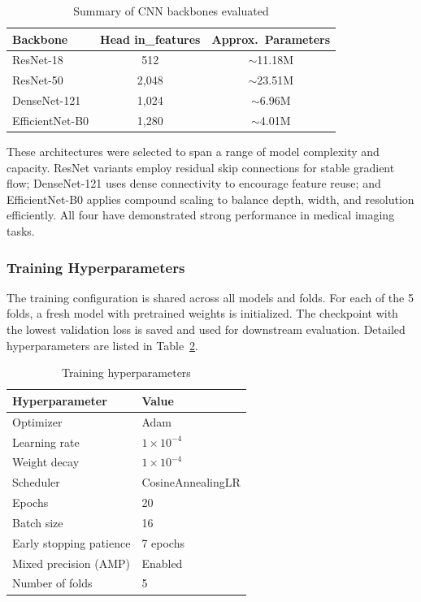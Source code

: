 \documentclass[conference]{IEEEtran}
\begin{document}
\begin{table}[t]
  \caption{Summary of CNN backbones evaluated}
  \label{tab:model_table}
  \centering
  \begin{tabular}{lcc}
    \toprule
    \textbf{Backbone} & \textbf{Head in\_features} & \textbf{Approx.\ Parameters} \\
    \midrule
    ResNet-18       & 512   & $\sim$11.18M \\
    ResNet-50       & 2,048 & $\sim$23.51M \\
    DenseNet-121    & 1,024 & $\sim$6.96M  \\
    EfficientNet-B0 & 1,280 & $\sim$4.01M  \\
    \bottomrule
  \end{tabular}
\end{table}

These architectures were selected to span a range of model complexity and capacity. ResNet
variants employ residual skip connections for stable gradient flow; DenseNet-121 uses dense
connectivity to encourage feature reuse; and EfficientNet-B0 applies compound scaling to
balance depth, width, and resolution efficiently. All four have demonstrated strong performance
in medical imaging tasks.

\subsubsection{Training Hyperparameters}

\medskip
The training configuration is shared across all models and folds. For each of the 5 folds, a
fresh model with pretrained weights is initialized. The checkpoint with the lowest validation
loss is saved and used for downstream evaluation. Detailed hyperparameters are listed in
Table~\ref{tab:train_params}.

\begin{table}[t]
  \caption{Training hyperparameters}
  \label{tab:train_params}
  \centering
  \begin{tabular}{ll}
    \toprule
    \textbf{Hyperparameter} & \textbf{Value} \\
    \midrule
    Optimizer                   & Adam \\
    Learning rate               & $1 \times 10^{-4}$ \\
    Weight decay                & $1 \times 10^{-4}$ \\
    Scheduler                   & CosineAnnealingLR \\
    Epochs                      & 20 \\
    Batch size                  & 16 \\
    Early stopping patience     & 7 epochs \\
    Mixed precision (AMP)       & Enabled \\
    Number of folds             & 5 \\
    \bottomrule
  \end{tabular}
\end{table}
\end{document}
